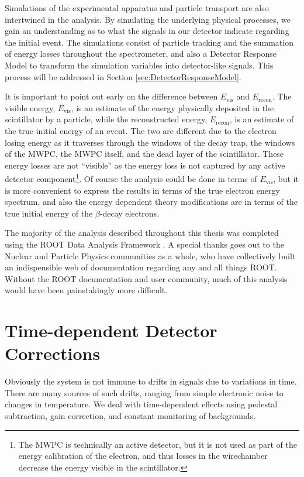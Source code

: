 Simulations of the experimental apparatus and particle transport are also intertwined
in the analysis. By simulating the underlying physical processes, we gain an understanding
as to what the signals in our detector indicate regarding the initial event. The simulations
consist of particle tracking and the summation of energy losses throughout
the spectrometer, and also a Detector Response Model to transform the simulation variables
into detector-like signals. This process will be addressed in Section \ref{sec:DetectorResponseModel}.

It is important to point out early on the difference between $E_{\mathrm{vis}}$ and
$E_{\mathrm{recon}}$. The  visible energy, $E_{\mathrm{vis}}$, is an estimate of the energy
physically deposited in the
scintillator by a particle, while the reconstructed energy, $E_{\mathrm{recon}}$, is an estimate of
the true initial energy of an event. The two are different due to the electron losing energy
as it traverses through the windows of the decay trap, the windows of the MWPC,
the MWPC itself, and the dead layer of the scintillator. These energy losses are not
``visible'' as the energy loss is not captured by any active detector component\footnote{The MWPC is technically
  an active detector, but it is not used as part of the energy calibration of the electron, and thus losses in
the wirechamber decrease the energy visible in the scintillator.}.
Of course the analysis could be
done in terms of $E_{\mathrm{vis}}$, but it is more convenient to express the results
in terms of the true electron energy spectrum, and also the energy dependent theory modifications
are in terms of the true initial energy of the $\beta$-decay electrons.

The majority of the analysis described throughout this thesis was completed using
the ROOT Data Analysis Framework \cite{brun1997root}. A special thanks goes out to
the Nuclear and Particle Physics communities as a whole, who have collectively built an indispensible
web of documentation regarding any and all things ROOT. Without the ROOT documentation
and user community, much of this analysis would have been painstakingly more difficult.




\section{Time-dependent Detector Corrections}

Obviously the system is not immune to drifts in signals due to variations
in time. There are many sources of such drifts, ranging from simple
electronic noise to changes in temperature. We deal with time-dependent
effects using pedestal subtraction, gain correction, and constant monitoring
of backgrounds.

